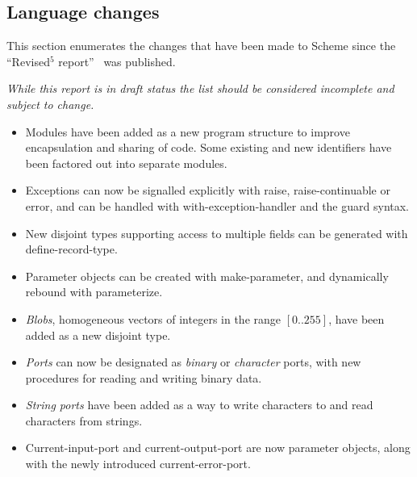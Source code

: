 


\subsection*{Language changes}
\label{differences}

This section enumerates the changes that have been made to Scheme since
the ``Revised$^5$ report''~\cite{R5RS} was published.

{\em While this report is in draft status the list should be considered incomplete and subject to change.}

\begin{itemize}

\item Modules have been added as a new program structure to improve
encapsulation and sharing of code.  Some existing and new identifiers
have been factored out into separate modules.

\item Exceptions can now be signalled explicitly with {\cf raise},
{\cf raise-continuable} or {\cf error}, and can be handled with {\cf
with-exception-handler} and the {\cf guard} syntax.

\item New disjoint types supporting access to multiple fields can be
generated with {\cf define-record-type}.

\item Parameter objects can be created with {\cf make-parameter}, and
dynamically rebound with {\cf parameterize}.

\item {\em Blobs}, homogeneous vectors of integers in the range
$[0..255]$, have been added as a new disjoint type.

\item {\em Ports} can now be designated as {\em binary} or {\em
character} ports, with new procedures for reading and writing binary
data.

\item {\em String ports} have been added as a way to write characters
to and read characters from strings.

\item {\cf Current-input-port} and {\cf current-output-port} are now
parameter objects, along with the newly introduced {\cf
current-error-port}.


\end{itemize}
